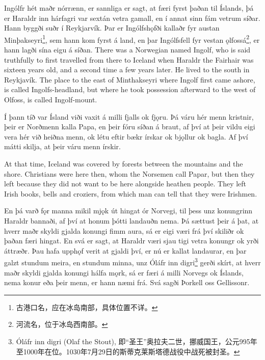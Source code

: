\begin{paracol}{2}

    Ingólfr hét maðr nórrænn, er sannliga er sagt, at færi fyrst þaðan til Íslands, þá er Haraldr inn hárfagri var sextán vetra gamall, en í annat sinn fám vetrum síðar. Hann byggði suðr í Reykjarvík. Þar er Ingólfshǫfði kallaðr fyr austan Minþakseyri\footnote{古港口名，应在冰岛南部，具体位置不详。}, sem hann kom fyrst á land, en þar Ingólfsfell fyr vestan ǫlfossá\footnote{河流名，位于冰岛西南部。}, er hann lagði sína eigu á síðan.
    \switchcolumn
    There was a Norwegian named Ingolf, who is said truthfully to first travelled from there to Iceland when Haraldr the Fairhair was sixteen years old, and a second time a few years later. He lived to the south in Reykjavík. The place to the east of Minthakseyri where Ingolf first came ashore, is called Ingolfs-headland, but where he took possession afterward to the west of Olfoss, is called Ingolf-mount.

    \switchcolumn*

    Í þann tíð var Ísland viði vaxit á milli fjalls ok fjǫru. Þá váru hér menn kristnir, þeir er Norðmenn kalla Papa, en þeir fóru síðan á braut, af því at þeir vildu eigi vera hér við heiðna menn, ok létu eftir bækr írskar ok bjǫllur ok bagla. Af því mátti skilja, at þeir váru menn írskir.

    \switchcolumn

    At that time, Iceland was covered by forests between the mountains and the shore. Christians were here then, whom the Norsemen call Papar, but then they left because they did not want to be here alongside heathen people. They left Irish books, bells and croziers, from which man can tell that they were Irishmen.

    \switchcolumn*

    En þá varð fǫr manna mikil mjǫk út hingat ór Norvegi, til þess unz konungrinn Haraldr bannaði, af því at honum þótti landauðn nema. Þá sættust þeir á þat, at hverr maðr skyldi gjalda konungi fimm aura, sá er eigi væri frá því skiliðr ok þaðan færi hingat. En svá er sagt, at Haraldr væri sjau tigi vetra konungr ok yrði áttræðr. Þau hafa upphǫf verit at gjaldi því, er nú er kallat landaurar, en þar galzt stundum meira, en stundum minna, unz Óláfr inn digri\footnote{Óláfr inn digri (Olaf the Stout), 即“圣王”奥拉夫二世，挪威国王，公元995年至1000年在位。1030年7月29日的斯蒂克莱斯塔德战役中战死被封圣。} gerði skírt, at hverr maðr skyldi gjalda konungi hálfa mǫrk, sá er færi á milli Norvegs ok Íslands, nema konur eða þeir menn, er hann næmi frá. Svá sagði Þorkell oss Gellissonr.


\end{paracol}
